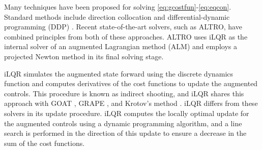 Many techniques have been proposed for solving \eqref{eq:gcostfun}-\eqref{eq:eqcon}. Standard 
methods include direction collocation \cite{Hargraves87} and differential-dynamic programming
(DDP) \cite{Mayne1966a}. Recent state-of-the-art solvers, such as ALTRO,
have combined principles from both of these approaches. ALTRO uses iLQR
\cite{Li2004a} as the internal solver of an augmented Lagrangian method (ALM)
\cite{lantoine2012hybrid, plancher2017constrained}
and employs a projected Newton method \cite{bertsekas1982projected, rao1998application}
in its final solving stage.

iLQR simulates the augmented state forward
using the discrete dynamics function 
and computes derivatives of the cost functions
to update the augmented controls. This procedure is known as
indirect shooting, and iLQR shares this approach with GOAT \cite{machnes2015tunable},
GRAPE \cite{khaneja2005optimal, leung2017speedup}, and Krotov's method \cite{goerz2019krotov}.
iLQR differs from these solvers
in its update procedure. iLQR computes the locally optimal update for the augmented
controls using a dynamic programming algorithm, and a line search is performed
in the direction of this update to ensure a decrease in the sum of the cost functions.

